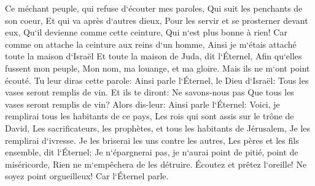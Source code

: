 \verse Ce méchant peuple, qui refuse d`écouter mes paroles, Qui suit les penchants de son coeur, Et qui va après d`autres dieux, Pour les servir et se prosterner devant eux, Qu`il devienne comme cette ceinture, Qui n`est plus bonne à rien! 
\verse Car comme on attache la ceinture aux reins d`un homme, Ainsi je m`étais attaché toute la maison d`Israël Et toute la maison de Juda, dit l`Éternel, Afin qu`elles fussent mon peuple, Mon nom, ma louange, et ma gloire. Mais ils ne m`ont point écouté. 
\verse Tu leur diras cette parole: Ainsi parle l`Éternel, le Dieu d`Israël: Tous les vases seront remplis de vin. Et ils te diront: Ne savons-nous pas Que tous les vases seront remplis de vin? 
\verse Alors dis-leur: Ainsi parle l`Éternel: Voici, je remplirai tous les habitants de ce pays, Les rois qui sont assis sur le trône de David, Les sacrificateurs, les prophètes, et tous les habitants de Jérusalem, Je les remplirai d`ivresse. 
\verse Je les briserai les uns contre les autres, Les pères et les fils ensemble, dit l`Éternel; Je n`épargnerai pas, je n`aurai point de pitié, point de miséricorde, Rien ne m`empêchera de les détruire. 
\verse Écoutez et prêtez l`oreille! Ne soyez point orgueilleux! Car l`Éternel parle. 
